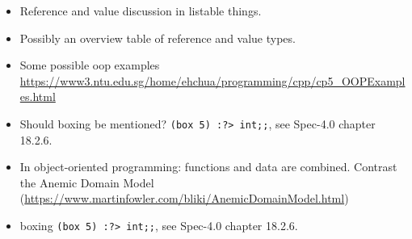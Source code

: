 \documentclass[fsharpnotes.tex]{subfiles}
\begin{document}
\begin{itemize}
\item Reference and value discussion in listable things.
\item Possibly an overview table of reference and value types.
\item Some possible oop examples \url{https://www3.ntu.edu.sg/home/ehchua/programming/cpp/cp5_OOPExamples.html}
\item Should boxing be mentioned? \lstinline|(box 5) :?> int;;|, see Spec-4.0 chapter 18.2.6.
\item In object-oriented programming: functions and data are combined. Contrast the Anemic Domain Model (\url{https://www.martinfowler.com/bliki/AnemicDomainModel.html})
\item boxing \lstinline|(box 5) :?> int;;|, see Spec-4.0 chapter 18.2.6.
\end{itemize}
\end{document}
